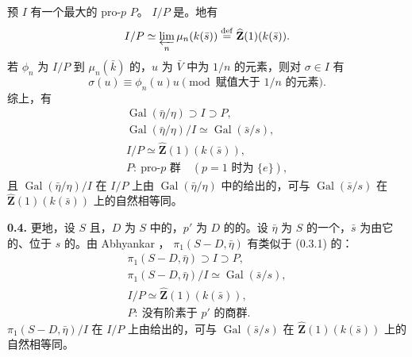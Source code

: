 预 $I$ 有一个最大的 pro-$p$  $P$。 $I/P$ 是。地有
\[
I/P\simeq\varprojlim_n\mu_n(k(\bar s))\overset{\mathrm{def}}=\widehat{\mathbf Z}(1)(k(\bar s)).
\]
若 $\phi_n$ 为 $I/P$ 到 $\mu_n(\bar k)$ 的，$u$ 为 $\bar V$ 中为 $1/n$ 的元素，则对 $\sigma\in I$ 有
\[
\sigma(u)\equiv\phi_n(u)u\pmod{\text{赋值大于 }1/n\text{ 的元素}}.
\]
综上，有
\[
\begin{gathered}
\operatorname{Gal}(\bar\eta/\eta)\supset I\supset P,\\
\operatorname{Gal}(\bar\eta/\eta)/I\simeq\operatorname{Gal}(\bar s/s),\\
I/P\simeq\widehat{\mathbf Z}(1)(k(\bar s)),\\
P:\ \text{pro-}p\text{ 群}\quad(p=1\text{ 时为 }\{e\}),
\end{gathered}\tag{0.3.1}
\]
且 $\operatorname{Gal}(\bar\eta/\eta)/I$ 在 $I/P$ 上由 $\operatorname{Gal}(\bar\eta/\eta)$ 中的给出的，可与 $\operatorname{Gal}(\bar s/s)$ 在 $\widehat{\mathbf Z}(1)(k(\bar s))$ 上的自然相等同。

\textbf{0.4.} 更地，设 $S$ 且，$D$ 为 $S$ 中的，$p'$ 为 $D$ 的的。设 $\bar\eta$ 为 $S$ 的一个，$\bar s$ 为由它的、位于 $s$ 的。由 Abhyankar ， $\pi_1(S-D,\bar\eta)$ 有类似于 (0.3.1) 的：
\[
\begin{gathered}
\pi_1(S-D,\bar\eta)\supset I\supset P,\\
\pi_1(S-D,\bar\eta)/I\simeq\operatorname{Gal}(\bar s/s),\\
I/P\simeq\widehat{\mathbf Z}(1)(k(\bar s)),\\
P:\ \text{没有阶素于 }p'\text{ 的商群}.
\end{gathered}\tag{0.4.1}
\]
$\pi_1(S-D,\bar\eta)/I$ 在 $I/P$ 上由给出的，可与 $\operatorname{Gal}(\bar s/s)$ 在 $\widehat{\mathbf Z}(1)(k(\bar s))$ 上的自然相等同。


